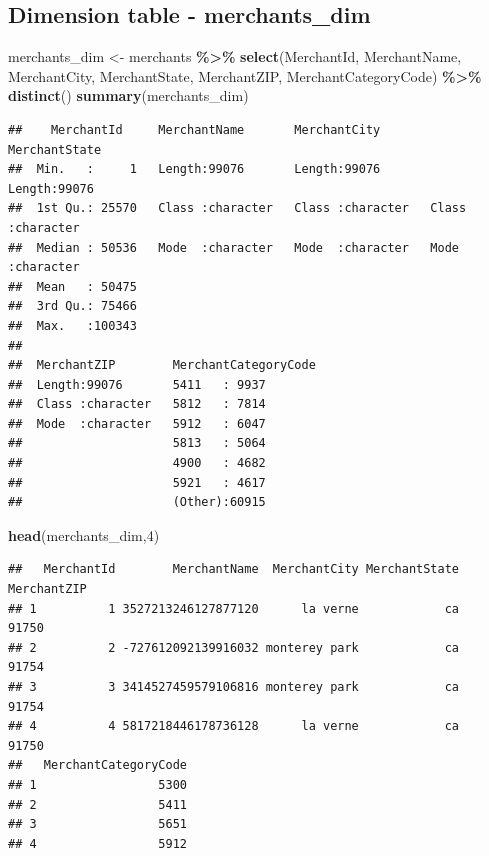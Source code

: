 \documentclass[
]{article}
\newenvironment{Shaded}{\begin{snugshade}}{\end{snugshade}}
\newcommand{\DecValTok}[1]{\textcolor[rgb]{0.00,0.00,0.81}{#1}}
\newcommand{\FunctionTok}[1]{\textcolor[rgb]{0.13,0.29,0.53}{\textbf{#1}}}
\newcommand{\NormalTok}[1]{#1}
\newcommand{\OtherTok}[1]{\textcolor[rgb]{0.56,0.35,0.01}{#1}}
\newcommand{\SpecialCharTok}[1]{\textcolor[rgb]{0.81,0.36,0.00}{\textbf{#1}}}
\begin{document}
\subsection{Dimension table -
merchants\_dim}\label{dimension-table---merchants_dim}

\begin{Shaded}
\begin{Highlighting}[]
\NormalTok{merchants\_dim }\OtherTok{\textless{}{-}}\NormalTok{ merchants }\SpecialCharTok{\%\textgreater{}\%} \FunctionTok{select}\NormalTok{(MerchantId, MerchantName, MerchantCity, }
\NormalTok{                                      MerchantState, MerchantZIP, }
\NormalTok{                                      MerchantCategoryCode) }\SpecialCharTok{\%\textgreater{}\%} \FunctionTok{distinct}\NormalTok{()}
\FunctionTok{summary}\NormalTok{(merchants\_dim)}
\end{Highlighting}
\end{Shaded}

\begin{verbatim}
##    MerchantId     MerchantName       MerchantCity       MerchantState     
##  Min.   :     1   Length:99076       Length:99076       Length:99076      
##  1st Qu.: 25570   Class :character   Class :character   Class :character  
##  Median : 50536   Mode  :character   Mode  :character   Mode  :character  
##  Mean   : 50475                                                           
##  3rd Qu.: 75466                                                           
##  Max.   :100343                                                           
##                                                                           
##  MerchantZIP        MerchantCategoryCode
##  Length:99076       5411   : 9937       
##  Class :character   5812   : 7814       
##  Mode  :character   5912   : 6047       
##                     5813   : 5064       
##                     4900   : 4682       
##                     5921   : 4617       
##                     (Other):60915
\end{verbatim}

\begin{Shaded}
\begin{Highlighting}[]
\FunctionTok{head}\NormalTok{(merchants\_dim,}\DecValTok{4}\NormalTok{)}
\end{Highlighting}
\end{Shaded}

\begin{verbatim}
##   MerchantId        MerchantName  MerchantCity MerchantState MerchantZIP
## 1          1 3527213246127877120      la verne            ca       91750
## 2          2 -727612092139916032 monterey park            ca       91754
## 3          3 3414527459579106816 monterey park            ca       91754
## 4          4 5817218446178736128      la verne            ca       91750
##   MerchantCategoryCode
## 1                 5300
## 2                 5411
## 3                 5651
## 4                 5912
\end{verbatim}
\end{document}
